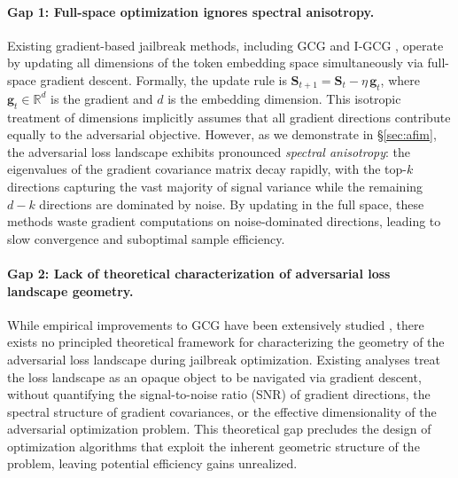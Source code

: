 \documentclass[preprint,12pt]{elsarticle}
\begin{document}
\paragraph{Gap 1: Full-space optimization ignores spectral anisotropy.} Existing gradient-based jailbreak methods, including GCG \cite{zou2023universal} and I-GCG \cite{jia2024improved}, operate by updating all dimensions of the token embedding space simultaneously via full-space gradient descent. Formally, the update rule is $\mathbf{S}_{t+1} = \mathbf{S}_t - \eta \, \mathbf{g}_t$, where $\mathbf{g}_t \in \mathbb{R}^d$ is the gradient and $d$ is the embedding dimension. This isotropic treatment of dimensions implicitly assumes that all gradient directions contribute equally to the adversarial objective. However, as we demonstrate in \S\ref{sec:afim}, the adversarial loss landscape exhibits pronounced \textit{spectral anisotropy}: the eigenvalues of the gradient covariance matrix decay rapidly, with the top-$k$ directions capturing the vast majority of signal variance while the remaining $d-k$ directions are dominated by noise. By updating in the full space, these methods waste gradient computations on noise-dominated directions, leading to slow convergence and suboptimal sample efficiency.

\paragraph{Gap 2: Lack of theoretical characterization of adversarial loss landscape geometry.} While empirical improvements to GCG have been extensively studied \cite{jia2024improved, zhu2023autodan, ren2024drattack}, there exists no principled theoretical framework for characterizing the geometry of the adversarial loss landscape during jailbreak optimization. Existing analyses treat the loss landscape as an opaque object to be navigated via gradient descent, without quantifying the signal-to-noise ratio (SNR) of gradient directions, the spectral structure of gradient covariances, or the effective dimensionality of the adversarial optimization problem. This theoretical gap precludes the design of optimization algorithms that exploit the inherent geometric structure of the problem, leaving potential efficiency gains unrealized.
\end{document}
